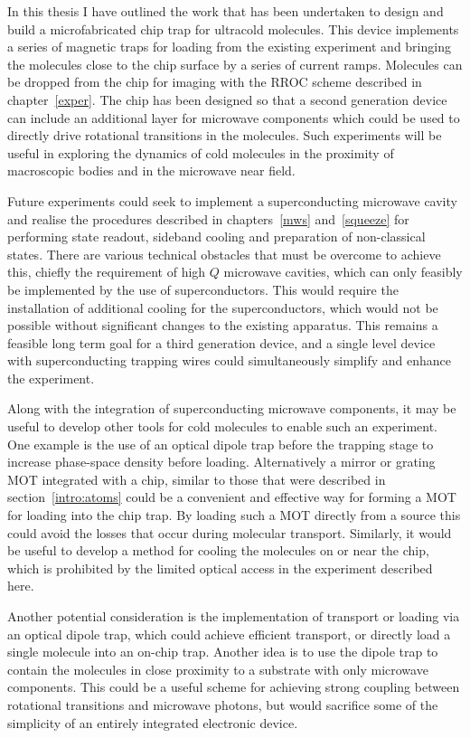 In this thesis I have outlined the work that has been undertaken to design and
build a microfabricated chip trap for ultracold molecules. This device
implements a series of magnetic traps for loading from the existing \CaF{}
experiment and bringing the molecules close to the chip surface by a series of
current ramps. Molecules can be dropped from the chip for imaging with the RROC
scheme described in chapter~\ref{exper}. The chip has been designed so
that a second generation device can include an additional layer for microwave
components which could be used to directly drive rotational transitions in the
molecules. Such experiments will be useful in exploring the dynamics of cold
molecules in the proximity of macroscopic bodies and in the microwave near
field.

Future experiments could seek to implement a superconducting microwave cavity
and realise the procedures described in chapters~\ref{mws} and~\ref{squeeze}
for performing state readout, sideband cooling and preparation of non-classical
states. There are various technical obstacles that must be overcome to achieve
this, chiefly the requirement of high $Q$ microwave cavities, which can only
feasibly be implemented by the use of superconductors.  This would require the
installation of additional cooling for the superconductors, which would not be
possible without significant changes to the existing apparatus. This
remains a feasible long term goal for a third generation device, and a
single level device with superconducting trapping wires could simultaneously
simplify and enhance the experiment.

Along with the integration of superconducting microwave components, it may be
useful to develop other tools for cold molecules to enable such an experiment.
One example is the use of an optical dipole trap before the trapping stage to
increase phase-space density before loading.  Alternatively a mirror or grating
MOT integrated with a chip, similar to those that were described in
section~\ref{intro:atoms} could be a convenient and effective way for forming a
\CaF{} MOT for loading into the chip trap. By loading such a MOT directly from
a source this could avoid the losses that occur during molecular transport.
Similarly, it would be useful to develop a method for cooling the molecules on
or near the chip, which is prohibited by the limited optical access in the
experiment described here.

Another potential consideration is the implementation of transport or loading
via an optical dipole trap, which could achieve efficient transport, or
directly load a single molecule into an on-chip trap. Another idea is to use
the dipole trap to contain the molecules in close proximity to a substrate with
only microwave components. This could be a useful scheme for achieving strong
coupling between rotational transitions and microwave photons, but would
sacrifice some of the simplicity of an entirely integrated electronic device.

